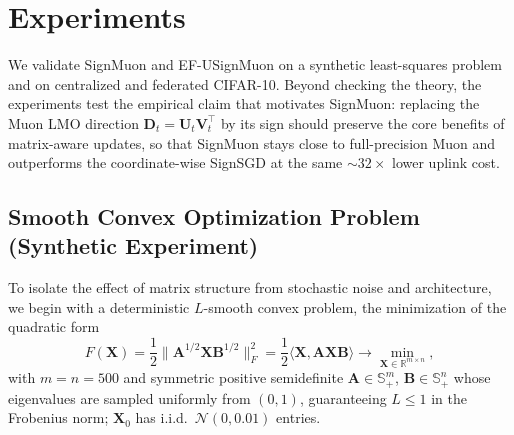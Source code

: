 \documentclass{article}
\begin{document}
\section{Experiments}\label{sec:exp}
We validate SignMuon and EF-USignMuon on a synthetic least-squares problem and on centralized and federated CIFAR-10. Beyond checking the theory, the experiments test the empirical claim that motivates SignMuon: replacing the Muon LMO direction $\mathbf{D}_t = \mathbf{U}_t\mathbf{V}_t^\top$ by its sign should preserve the core benefits of matrix-aware updates, so that SignMuon stays close to full-precision Muon and outperforms the coordinate-wise SignSGD at the same ${\sim}32\times$ lower uplink cost.

\subsection{Smooth Convex Optimization Problem (Synthetic Experiment)}
To isolate the effect of matrix structure from stochastic noise and architecture, we begin with a deterministic $L$-smooth convex problem, the minimization of the quadratic form
\begin{equation}
F(\mathbf{X}) = \frac{1}{2} \|\mathbf{A}^{1/2} \mathbf{X} \mathbf{B}^{1/2}\|_F^2 = \frac{1}{2} \langle \mathbf{X}, \mathbf{A} \mathbf{X} \mathbf{B} \rangle \to \min_{\mathbf{X} \in \mathbb{R}^{m \times n}},
\label{eq:synthetic_problem}
\end{equation}
with $m = n = 500$ and symmetric positive semidefinite $\mathbf{A} \in \mathbb{S}_+^m$, $\mathbf{B} \in \mathbb{S}_+^n$ whose eigenvalues are sampled uniformly from $(0,1)$, guaranteeing $L \le 1$ in the Frobenius norm; $\mathbf{X}_0$ has i.i.d.\ $\mathcal{N}(0, 0.01)$ entries.
\end{document}
